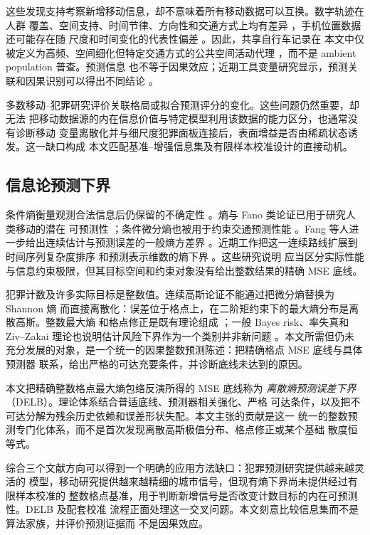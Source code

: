 这些发现支持考察新增移动信息，却不意味着所有移动数据可以互换。数字轨迹在人群
覆盖、空间支持、时间节律、方向性和交通方式上均有差异
\citep{luca2023mobilitysurvey,zhao2024directionality}，手机位置数据还可能存在随
尺度和时间变化的代表性偏差 \citep{li2024mobilitybias}。因此，共享自行车记录在
本文中仅被定义为高频、空间细化但特定交通方式的公共空间活动代理
\citep{xu2023bike,ivanovic2023bike}，而不是 ambient population 普查。预测信息
也不等于因果效应；近期工具变量研究显示，预测关联和因果识别可以得出不同结论
\citep{vachuska2025causal}。

多数移动--犯罪研究评价关联格局或拟合预测评分的变化。这些问题仍然重要，却无法
把移动数据源的内在信息价值与特定模型利用该数据的能力区分，也通常没有诊断移动
变量离散化并与细尺度犯罪面板连接后，表面增益是否由稀疏状态诱发。这一缺口构成
本文匹配基准--增强信息集及有限样本校准设计的直接动机。

\subsection{信息论预测下界}
\label{subsec:related_information_limits}

条件熵衡量观测合法信息后仍保留的不确定性
\citep{shannon1948,cover_thomas}。熵与 Fano 类论证已用于研究人类移动的潜在
可预测性 \citep{song2010limits}；条件微分熵也被用于约束交通预测性能
\citep{li2022traffic}。Fang 等人进一步给出连续估计与预测误差的一般熵方差界
\citep{fang_variance_bounds}。近期工作把这一连续路线扩展到时间序列复杂度排序
和预测表示维数的熵下界 \citep{ayers2025complexity,hauser2026dmd}。这些研究说明
应当区分实际性能与信息约束极限，但其目标空间和约束对象没有给出整数结果的精确
MSE 底线。

犯罪计数及许多实际目标是整数值。连续高斯论证不能通过把微分熵替换为 Shannon 熵
而直接离散化：误差位于格点上，在二阶矩约束下的最大熵分布是离散高斯。整数最大熵
和格点修正是既有理论组成 \citep{massey_integer_entropy,rioul_massey}；一般
Bayes risk、率失真和 Ziv--Zakai 理论也说明估计风险下界作为一个类别并非新问题
\citep{shannon_rate_distortion,chen_bayes_risk,jeong_ziv_zakai}。本文所需但仍未
充分发展的对象，是一个统一的因果整数预测陈述：把精确格点 MSE 底线与具体预测器
联系，给出严格的可达充要条件，并诊断底线未达到的原因。

本文把精确整数格点最大熵包络反演所得的 MSE 底线称为
\emph{离散熵预测误差下界}（DELB）。理论体系结合普适底线、预测器相关强化、严格
可达条件，以及把不可达分解为残余历史依赖和误差形状失配。本文主张的贡献是这一
统一的整数预测专门化体系，而不是首次发现离散高斯极值分布、格点修正或某个基础
散度恒等式。

综合三个文献方向可以得到一个明确的应用方法缺口：犯罪预测研究提供越来越灵活的
模型，移动研究提供越来越精细的城市信号，但现有熵下界尚未提供经过有限样本校准的
整数格点基准，用于判断新增信号是否改变计数目标的内在可预测性。DELB 及配套校准
流程正面处理这一交叉问题。本文刻意比较信息集而不是算法家族，并评价预测证据而
不是因果效应。
